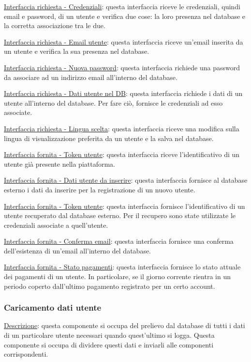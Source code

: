 \documentclass[a4paper,12pt]{article}
\begin{document}
\underline{Interfaccia richiesta - Credenziali}: questa interfaccia riceve le credenziali, quindi email e password, di un utente e verifica due cose: la loro presenza nel database e la corretta associazione tra le due.

\underline{Interfaccia richiesta - Email utente}: questa interfaccia riceve un’email inserita da un utente e verifica la sua presenza nel database.

\underline{Interfaccia richiesta - Nuova password}: questa interfaccia richiede una password da associare ad un indirizzo email all’interno del database.

\underline{Interfaccia richiesta - Dati utente nel DB}: questa interfaccia richiede i dati di un utente all’interno del database. Per fare ciò, fornisce le credenziali ad esso associate.

\underline{Interfaccia richiesta - Lingua scelta}: questa interfaccia riceve una modifica sulla lingua di visualizzazione preferita da un utente e la salva nel database.

\underline{Interfaccia fornita - Token utente}: questa interfaccia riceve l’identificativo di un utente già presente nella piattaforma.

\underline{Interfaccia fornita - Dati utente da inserire}: questa interfaccia fornisce al database esterno i dati da inserire per la registrazione di un nuovo utente.

\underline{Interfaccia fornita - Token utente}: questa interfaccia fornisce l’identificativo di un utente recuperato dal database esterno. Per il recupero sono state utilizzate le credenziali associate a quell’utente.

\underline{Interfaccia fornita - Conferma email}: questa interfaccia fornisce una conferma dell’esistenza di un’email all’interno del database.

\underline{Interfaccia fornita - Stato pagamenti}: questa interfaccia fornisce lo stato attuale dei pagamenti di un utente. In particolare, se il giorno corrente rientra in un periodo coperto dall’ultimo pagamento registrato per un certo account.

\subsubsection{Caricamento dati utente}

\underline{Descrizione}: questa componente si occupa del prelievo dal database di tutti i dati di un particolare utente necessari quando quest’ultimo si logga. Questa componente si occupa di dividere questi dati e inviarli alle componenti corrispondenti.
\end{document}
